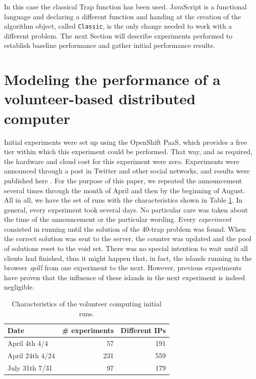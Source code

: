 \documentclass[letterpaper]{article}
\begin{document}
In this case the classical Trap function \citep{Ackley1987} has been
used. JavaScript is a functional language and declaring a different 
function and handing at the creation of the algorithm object, called
{\tt Classic}, is the only change needed to work with a different
problem. The next Section will describe experiments performed to
establish baseline performance and gather initial performance
results. 

\section{Modeling the performance of a volunteer-based distributed computer} %
\label{sec:experiments}

Initial experiments were set up using the OpenShift
PaaS, which provides a free tier within which this 
experiment could be performed. That way, and as required, the hardware
and cloud cost for this experiment were zero. Experiments were
announced through a post in Twitter and other social networks, and
results were published here \citep{DBLP:conf/gecco/GuervosG15}. For the
purpose of this paper, we repeated the announcement several times
through the month of April and then by the beginning of August. All
in all, we have the set of runs with the characteristics shown in
Table \ref{tab:runs}. In general, every experiment took several
days. No particular care was taken about the time of the announcement
or the particular wording. Every {\em experiment} consisted in running
until the solution of the 40-trap problem was found. When the correct
solution was sent to the server, the counter was updated and the pool
of solutions reset to the void set. There was no special intention to wait
until all clients had finished, thus it might happen that, in fact,
the islands running in the browser {\em spill} from one experiment to
the next. However, previous experiments have proven that the influence
of these islands in the next experiment is indeed negligible.
%
\begin{table}
\caption{Characteristics of the volunteer computing initial runs. \label{tab:runs}}
\begin{center}
\begin{tabular}{l|rr}
\hline
Date & \# experiments & Different IPs \\
\hline
April 4th 4/4 & 57 & 191 \\
April 24th 4/24 &  231 & 559 \\
July 31th 7/31 & 97 & 179 \\
\hline
\end{tabular}
\end{center}
\end{table}
\end{document}
